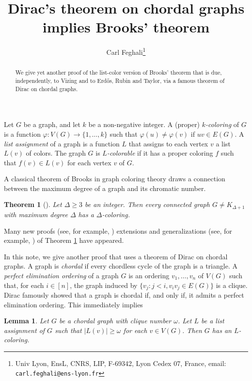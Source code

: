 \documentclass[11pt]{article}
\title{Dirac's theorem on chordal graphs implies Brooks' theorem}
\author{Carl Feghali\thanks{Univ Lyon, EnsL, CNRS, LIP, F-69342, Lyon Cedex 07, France, email: \texttt{carl.feghali@ens-lyon.fr}}}
\date{}
\newtheorem{theorem}{Theorem}
\newtheorem{lemma}{Lemma}
\theoremstyle{definition}
\begin{document}
\maketitle

\begin{abstract}
We give yet another proof of the list-color version of Brooks' theorem that is due, independently, to Vizing and to Erd\H{o}s, Rubin and Taylor, via a famous theorem of Dirac on chordal graphs. 
 \end{abstract}


Let $G$ be a graph, and let $k$ be a non-negative integer. 
A (proper) \emph{$k$-coloring} of $G$ is a function $\varphi: V(G) \rightarrow \{1, \dots, k\}$ such that $\varphi(u) \neq \varphi(v)$ if $uv \in E(G)$. A \emph{list assignment} of a graph is a function $L$ that assigns to
each vertex $v $ a list $L(v)$ of colors. The graph $G$ is \emph{$L$-colorable} if it has a
proper coloring $f$ such that $f(v) \in L(v)$ for each vertex $ v $ of  $G$. 

A classical theorem of Brooks  in graph coloring theory draws a connection between the maximum degree of a graph and its chromatic number. 

\begin{theorem}[\cite{brooks}]\label{conj}
Let $\Delta \geq 3$ be an integer. Then every connected graph $G \not= K_{\Delta + 1}$ with maximum degree $\Delta$
 has a $\Delta$-coloring.\end{theorem}
 
Many new proofs (see, for example, \cite{cranston, rabern, zajkac}) extensions and generalizations (see, for example, \cite{cranston, krivelevich, matamala}) of Theorem \ref{conj} have appeared.

 In this note, we give another proof that uses a theorem of Dirac on chordal graphs. A graph is \emph{chordal} if every chordless cycle of the graph is a triangle. A \emph{perfect elimination ordering} of a graph $G$ is an ordering $v_1, \dots, v_n$ of $V(G)$ such that, for each $i \in [n]$, the graph induced by $\{v_j: j < i, v_iv_j \in E(G)\}$ is a clique. Dirac \cite{dirac} famously showed that a graph is chordal if, and only if, it admits a perfect elimination ordering. This immediately implies

\begin{lemma}\label{lem}
Let $G$ be a chordal graph with clique number $\omega$. Let $L$ be a list assignment of $G$ such that $|L(v)| \geq \omega$ for each $v \in V(G)$. Then $G$ has an $L$-coloring. 
\end{lemma}
\end{document}
